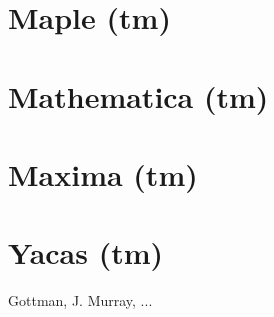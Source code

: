 \documentclass{book}
\begin{document}
\section{Maple (tm)}
\section{Mathematica (tm)}
\section{Maxima (tm)}
\section{Yacas (tm)}
%
\begin{thebibliography}{99}
 Gottman, J. Murray, ...
\end{thebibliography}
\printindex
\end{document}
